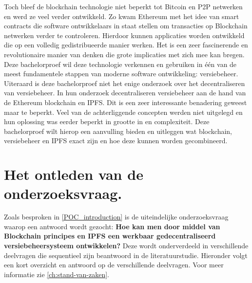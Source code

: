 Toch bleef de blockchain technologie niet beperkt tot Bitcoin en P2P netwerken en werd ze veel verder ontwikkeld. Zo kwam Ethereum met het idee van smart contracts die software ontwikkelaars in staat stellen om transacties op Blockchain netwerken verder te controleren. Hierdoor kunnen applicaties worden ontwikkeld die op een volledig gedistribueerde manier werken. Het is een zeer fascinerende en revolutionaire manier van denken die grote implicaties met zich mee kan bregen.\\

Deze bachelorproef wil deze technologie verkennen en gebruiken in één van de meest fundamentele stappen van moderne software ontwikkeling: versiebeheer.\\

Uiteraard is deze bachelorproef niet het enige onderzoek over het decentraliseren van versiebeheer. In hun onderzoek decentraliseren \textcite{Nizamuddin2019} versiebeheer aan de hand van de Ethereum blockchain en IPFS. Dit is een zeer interessante benadering geweest maar te beperkt. Veel van de achterliggende concepten werden niet uitgelegd en hun oplossing was eerder beperkt in grootte in en complexiteit. Deze bachelorproef wilt hierop een aanvulling bieden en uitleggen wat blockchain, versiebeheer en IPFS exact zijn en hoe deze kunnen worden gecombineerd.

\section{Het ontleden van de onderzoeksvraag.}
\label{ontleden van de onderzoeksvraag}
Zoals besproken in \ref{POC_introduction} is de uiteindelijke onderzoeksvraag waarop een antwoord wordt gezocht: \textbf{Hoe kan men door middel van Blockchain principes en IPFS een werkbaar gedecentraliseerd versiebeheersysteem ontwikkelen?} Deze wordt onderverdeeld in verschillende deelvragen die sequentieel zijn beantwoord in de literatuurstudie. Hieronder volgt een kort overzicht en antwoord op de verschillende deelvragen. Voor meer informatie zie \ref{ch:stand-van-zaken}.
 
